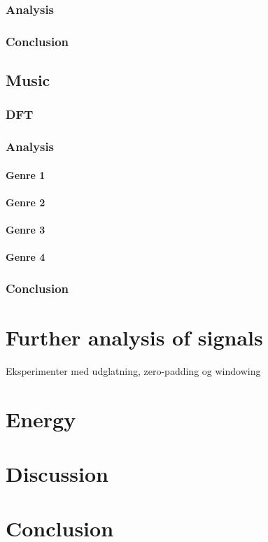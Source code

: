 \subsubsection{Analysis}

\subsubsection{Conclusion}

\subsection{Music}
\subsubsection{DFT}

\subsubsection{Analysis}

\paragraph{Genre 1}

\paragraph{Genre 2}

\paragraph{Genre 3}

\paragraph{Genre 4}

\subsubsection{Conclusion}

\section{Further analysis of signals}
Eksperimenter med udglatning, zero-padding og windowing 

\section{Energy}

\section{Discussion}

\section{Conclusion}